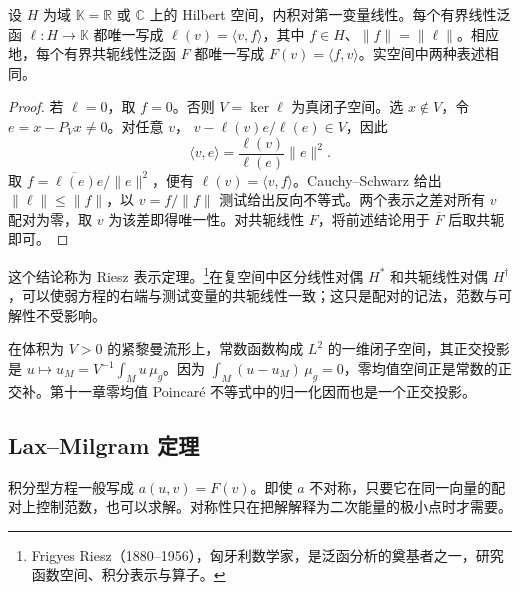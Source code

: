 \begin{theorem}\label{g3:thm:hilbert-riesz}
	设 \(H\) 为域 \(\mathbb K=\mathbb R\) 或 \(\mathbb C\) 上的 Hilbert 空间，内积对第一变量线性。每个有界线性泛函 \(\ell:H\to\mathbb K\) 都唯一写成
	\(\ell(v)=\langle v,f\rangle\)，其中 \(f\in H\)、\(\|f\|=\|\ell\|\)。相应地，每个有界共轭线性泛函 \(F\) 都唯一写成 \(F(v)=\langle f,v\rangle\)。实空间中两种表述相同。
\end{theorem}
\begin{proof}
	若 \(\ell=0\)，取 \(f=0\)。否则 \(V=\ker\ell\) 为真闭子空间。选 \(x\notin V\)，令 \(e=x-P_Vx\ne0\)。对任意 \(v\)，
	\(v-\ell(v)e/\ell(e)\in V\)，因此
	\[
		\langle v,e\rangle=\frac{\ell(v)}{\ell(e)}\|e\|^2.
	\]
	取 \(f=\overline{\ell(e)}e/\|e\|^2\)，便有 \(\ell(v)=\langle v,f\rangle\)。Cauchy--Schwarz 给出 \(\|\ell\|\le\|f\|\)，以 \(v=f/\|f\|\) 测试给出反向不等式。两个表示之差对所有 \(v\) 配对为零，取 \(v\) 为该差即得唯一性。对共轭线性 \(F\)，将前述结论用于 \(\overline F\) 后取共轭即可。
\end{proof}

这个结论称为 Riesz 表示定理。\footnote{Frigyes Riesz（1880--1956），匈牙利数学家，是泛函分析的奠基者之一，研究函数空间、积分表示与算子。}在复空间中区分线性对偶 \(H^*\) 和共轭线性对偶 \(H^\dagger\)，可以使弱方程的右端与测试变量的共轭线性一致；这只是配对的记法，范数与可解性不受影响。

\begin{example}\label{g3:exm:hilbert-mean-projection}
	在体积为 \(V>0\) 的紧黎曼流形上，常数函数构成 \(L^2\) 的一维闭子空间，其正交投影是 \(u\mapsto u_M=V^{-1}\int_Mu\,\mu_g\)。因为 \(\int_M(u-u_M)\,\mu_g=0\)，零均值空间正是常数的正交补。第十一章零均值 Poincaré 不等式中的归一化因而也是一个正交投影。
\end{example}

\subsection{Lax–Milgram 定理}
\label{g3:subsec:1201:02}
积分型方程一般写成 \(a(u,v)=F(v)\)。即使 \(a\) 不对称，只要它在同一向量的配对上控制范数，也可以求解。对称性只在把解解释为二次能量的极小点时才需要。

